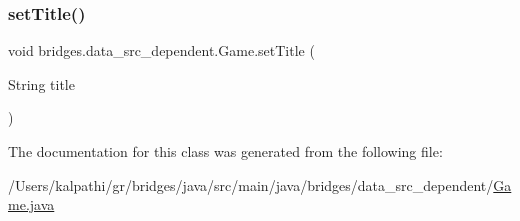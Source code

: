 \mbox{\label{classbridges_1_1data__src__dependent_1_1_game_a0c87151b75bc10357aa6829ebfc0cae3}} 
\subsubsection{\texorpdfstring{setTitle()}{setTitle()}}
{\footnotesize\ttfamily void bridges.\+data\+\_\+src\+\_\+dependent.\+Game.\+set\+Title (\begin{DoxyParamCaption}\item[{String}]{title }\end{DoxyParamCaption})}



The documentation for this class was generated from the following file\+:\begin{DoxyCompactItemize}
\item 
/\+Users/kalpathi/gr/bridges/java/src/main/java/bridges/data\+\_\+src\+\_\+dependent/\mbox{\hyperlink{_game_8java}{Game.\+java}}\end{DoxyCompactItemize}
